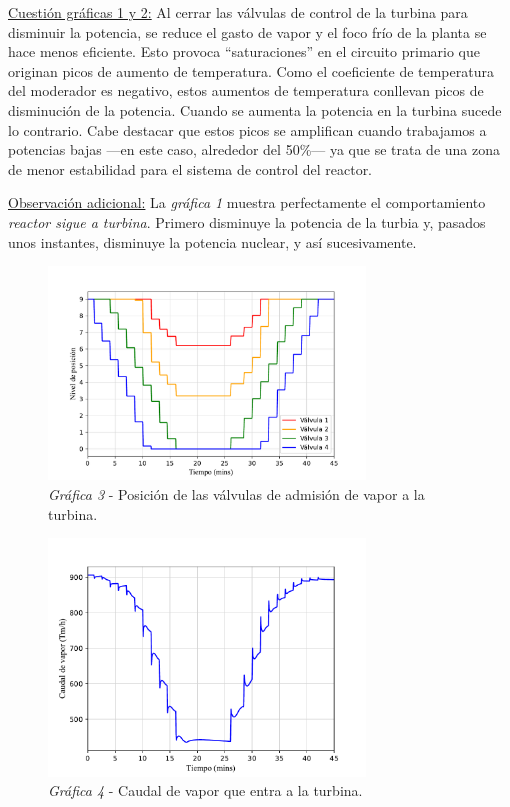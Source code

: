 \underline{Cuestión gráficas 1 y 2:} Al cerrar las válvulas de control de la turbina para disminuir la potencia, se reduce el gasto de vapor y el foco frío de la planta se hace menos eficiente. Esto provoca ``saturaciones'' en el circuito primario que originan picos de aumento de temperatura. Como el coeficiente de temperatura del moderador es negativo, estos aumentos de temperatura conllevan picos de disminución de la potencia. Cuando se aumenta la potencia en la turbina sucede lo contrario. Cabe destacar que estos picos se amplifican cuando trabajamos a potencias bajas ---en este caso, alrededor del 50\%--- ya que se trata de una zona de menor estabilidad para el sistema de control del reactor.

\underline{Observación adicional:} La \textit{gráfica 1} muestra perfectamente el comportamiento \textit{reactor sigue a turbina}. Primero disminuye la potencia de la turbia y, pasados unos instantes, disminuye la potencia nuclear, y así sucesivamente.

\begin{figure}[!h]
  \centering
  \includegraphics[width=0.75\textwidth]{content/figures/sim1_valvulas_control.pdf}
  \caption{\textit{Gráfica 3} - Posición de las válvulas de admisión de vapor a la turbina.}
  \label{fig:sim1_valvulas_control}
\end{figure}

\begin{figure}[h]
  \centering
  \includegraphics[width=0.75\textwidth]{content/figures/sim1_vapor.pdf}
  \caption{\textit{Gráfica 4} - Caudal de vapor que entra a la turbina.}
  \label{fig:sim1_vapor}
\end{figure}

